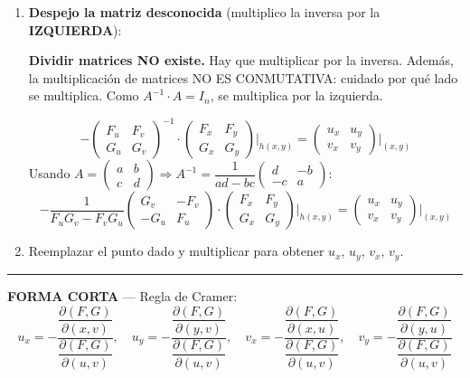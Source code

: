 \documentclass[letterpaper, 12pt]{article}
\newenvironment{seccionbox}[1]{%
    \begin{tcolorbox}[
        colback=celesteSuave,
        colframe=azulFuerte,
        coltitle=white,
        fonttitle=\bfseries\large,
        title=#1,
        arc=6pt,
        boxrule=1pt,
        breakable,
        enhanced,
        before upper={\parskip=4pt}
    ]
}{%
    \end{tcolorbox}
}
\newenvironment{notabox}{%
    \begin{tcolorbox}[
        colback=white,
        colframe=turquesaUsach,
        arc=4pt,
        boxrule=0.8pt,
        left=6pt, right=6pt, top=4pt, bottom=4pt
    ]
}{%
    \end{tcolorbox}
}
\begin{document}
\begin{seccionbox}{5. Teorema de la Función Implícita}
\begin{enumerate}
    \item \textbf{Despejo la matriz desconocida} (multiplico la inversa por la \textbf{IZQUIERDA}):
    \begin{notabox}
    \textcolor{rojoAviso}{\textbf{Dividir matrices NO existe.}} Hay que multiplicar por la inversa. Además, la multiplicación de matrices \textcolor{rojoAviso}{NO ES CONMUTATIVA}: cuidado por qué lado se multiplica. Como $A^{-1}\cdot A = I_n$, se multiplica por la izquierda.
    \end{notabox}
    $$ -\begin{pmatrix}F_u&F_v\\G_u&G_v\end{pmatrix}^{-1} \cdot \begin{pmatrix}F_x&F_y\\G_x&G_y\end{pmatrix}\Bigg|_{h(x,y)} = \begin{pmatrix}u_x&u_y\\v_x&v_y\end{pmatrix}\Bigg|_{(x,y)} $$
    Usando $A = \begin{pmatrix}a&b\\c&d\end{pmatrix} \Rightarrow A^{-1} = \dfrac{1}{ad-bc}\begin{pmatrix}d&-b\\-c&a\end{pmatrix}$:
    $$ -\frac{1}{F_uG_v - F_vG_u}\begin{pmatrix}G_v&-F_v\\-G_u&F_u\end{pmatrix} \cdot \begin{pmatrix}F_x&F_y\\G_x&G_y\end{pmatrix}\Bigg|_{h(x,y)} = \begin{pmatrix}u_x&u_y\\v_x&v_y\end{pmatrix}\Bigg|_{(x,y)} $$

    \item Reemplazar el punto dado y multiplicar para obtener $u_x,\,u_y,\,v_x,\,v_y$.
\end{enumerate}

\medskip\hrule\medskip

\textbf{FORMA CORTA} — Regla de Cramer:
$$u_x = -\frac{\dfrac{\partial(F,G)}{\partial(x,v)}}{\dfrac{\partial(F,G)}{\partial(u,v)}}, \quad
u_y = -\frac{\dfrac{\partial(F,G)}{\partial(y,v)}}{\dfrac{\partial(F,G)}{\partial(u,v)}}, \quad
v_x = -\frac{\dfrac{\partial(F,G)}{\partial(x,u)}}{\dfrac{\partial(F,G)}{\partial(u,v)}}, \quad
v_y = -\frac{\dfrac{\partial(F,G)}{\partial(y,u)}}{\dfrac{\partial(F,G)}{\partial(u,v)}}$$


\end{seccionbox}
\end{document}
